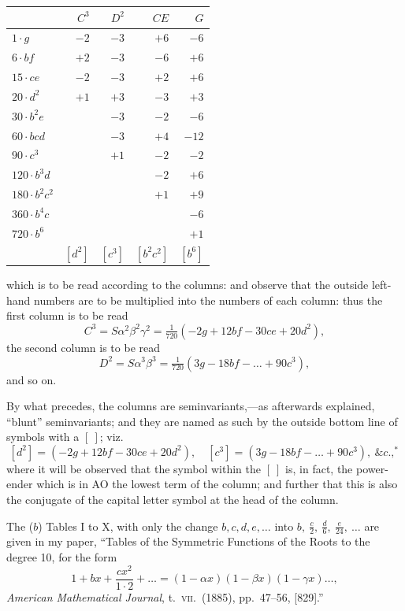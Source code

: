 \documentclass[11pt]{article}
\begin{document}
\begin{center}
\begin{tabular}{l|rrrr}
 & $C^3$ & $D^2$ & $CE$ & $G$ \\
\hline
$1\cdot g$ & $-2$ & $-3$ & $+6$ & $-6$ \\
$6\cdot bf$ & $+2$ & $-3$ & $-6$ & $+6$ \\
$15\cdot ce$ & $-2$ & $-3$ & $+2$ & $+6$ \\
$20\cdot d^2$ & $+1$ & $+3$ & $-3$ & $+3$ \\
$30\cdot b^2 e$ & & $-3$ & $-2$ & $-6$ \\
$60\cdot bcd$ & & $-3$ & $+4$ & $-12$ \\
$90\cdot c^3$ & & $+1$ & $-2$ & $-2$ \\
$120\cdot b^3 d$ & & & $-2$ & $+6$ \\
$180\cdot b^2 c^2$ & & & $+1$ & $+9$ \\
$360\cdot b^4 c$ & & & & $-6$ \\
$720\cdot b^6$ & & & & $+1$ \\
\hline
& $[d^2]$ & $[c^3]$ & $[b^2 c^2]$ & $[b^6]$ \\
\end{tabular}
\end{center}

which is to be read according to the columns: and observe that the outside left-hand numbers are to be multiplied into the numbers of each column: thus the first column is to be read
\[
C^3 = S\alpha^2\beta^2\gamma^2 = \tfrac{1}{720}(-2g + 12bf - 30ce + 20d^2),
\]
the second column is to be read
\[
D^2 = S\alpha^3\beta^3 = \tfrac{1}{720}(3g - 18bf - \ldots + 90c^3),
\]
and so on.

By what precedes, the columns are seminvariants,---as afterwards explained, ``blunt'' seminvariants; and they are named as such by the outside bottom line of symbols with a $[\ ]$; viz.
\[
[d^2] = (-2g + 12bf - 30ce + 20d^2),\quad [c^3] = (3g - 18bf - \ldots + 90c^3),\ \&c.,^*
\]
where it will be observed that the symbol within the $[\ ]$ is, in fact, the power-ender which is in AO the lowest term of the column; and further that this is also the conjugate of the capital letter symbol at the head of the column.

The ($b$) Tables I to X, with only the change $b, c, d, e, \ldots$ into $b,\ \tfrac{c}{2},\ \tfrac{d}{6},\ \tfrac{e}{24},\ \ldots$ are given in my paper, ``Tables of the Symmetric Functions of the Roots to the degree 10, for the form
\[
1 + bx + \frac{c x^2}{1\cdot 2} + \ldots = (1 - \alpha x)(1 - \beta x)(1 - \gamma x)\ldots,
\]
\textit{American Mathematical Journal}, t.\ \textsc{vii}.\ (1885), pp.\ 47--56, [829].''
\end{document}
